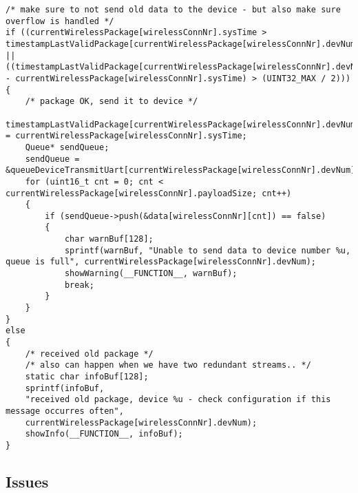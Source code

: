\begin{lstlisting}
/* make sure to not send old data to the device - but also make sure overflow is handled */
if ((currentWirelessPackage[wirelessConnNr].sysTime > timestampLastValidPackage[currentWirelessPackage[wirelessConnNr].devNum]) ||
((timestampLastValidPackage[currentWirelessPackage[wirelessConnNr].devNum] - currentWirelessPackage[wirelessConnNr].sysTime) > (UINT32_MAX / 2)))
{
    /* package OK, send it to device */
    timestampLastValidPackage[currentWirelessPackage[wirelessConnNr].devNum] = currentWirelessPackage[wirelessConnNr].sysTime;
    Queue* sendQueue;
    sendQueue = &queueDeviceTransmitUart[currentWirelessPackage[wirelessConnNr].devNum];
    for (uint16_t cnt = 0; cnt < currentWirelessPackage[wirelessConnNr].payloadSize; cnt++)
    {
        if (sendQueue->push(&data[wirelessConnNr][cnt]) == false)
        {
            char warnBuf[128];
            sprintf(warnBuf, "Unable to send data to device number %u, queue is full", currentWirelessPackage[wirelessConnNr].devNum);
            showWarning(__FUNCTION__, warnBuf);
            break;
        }
    }
}
else
{
    /* received old package */
    /* also can happen when we have two redundant streams.. */
    static char infoBuf[128];
    sprintf(infoBuf, 
    "received old package, device %u - check configuration if this message occurres often",
    currentWirelessPackage[wirelessConnNr].devNum);
    showInfo(__FUNCTION__, infoBuf);
}
\end{lstlisting}
%
%
%
\subsection{Issues}
%
